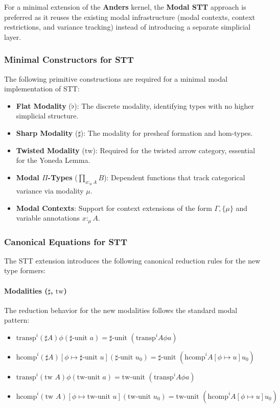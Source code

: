 \documentclass{article}
\begin{document}
For a minimal extension of the \textbf{Anders} kernel, the \textbf{Modal STT} approach is preferred as it reuses the existing modal infrastructure (modal contexts, context restrictions, and variance tracking) instead of introducing a separate simplicial layer.

\subsubsection*{Minimal Constructors for STT}

The following primitive constructions are required for a minimal modal implementation of STT:

\begin{itemize}
    \item \textbf{Flat Modality} ($\flat$): The discrete modality, identifying types with no higher simplicial structure.
    \item \textbf{Sharp Modality} ($\sharp$): The modality for presheaf formation and hom-types.
    \item \textbf{Twisted Modality} ($\text{tw}$): Required for the twisted arrow category, essential for the Yoneda Lemma.
    \item \textbf{Modal $\Pi$-Types} ($\prod_{x :_\mu A} B$): Dependent functions that track categorical variance via modality $\mu$.
    \item \textbf{Modal Contexts}: Support for context extensions of the form $\Gamma, \{\mu\}$ and variable annotations $x :_\mu A$.
\end{itemize}

\newpage
\subsubsection{Canonical Equations for STT}

The STT extension introduces the following canonical reduction rules for the new type formers:

\paragraph{Modalities ($\sharp$, $\text{tw}$)}
The reduction behavior for the new modalities follows the standard modal pattern:
\begin{itemize}
    \item $\text{transp}^i (\sharp A) \phi (\sharp\text{-unit } a) = \sharp\text{-unit } (\text{transp}^i A \phi a)$
    \item $\text{hcomp}^i (\sharp A) [\phi \mapsto \sharp\text{-unit } u] (\sharp\text{-unit } u_0) = \sharp\text{-unit } (\text{hcomp}^i A [\phi \mapsto u] u_0)$
    \item $\text{transp}^i (\text{tw } A) \phi (\text{tw-unit } a) = \text{tw-unit } (\text{transp}^i A \phi a)$
    \item $\text{hcomp}^i (\text{tw } A) [\phi \mapsto \text{tw-unit } u] (\text{tw-unit } u_0) = \text{tw-unit } (\text{hcomp}^i A [\phi \mapsto u] u_0)$
\end{itemize}
\end{document}
